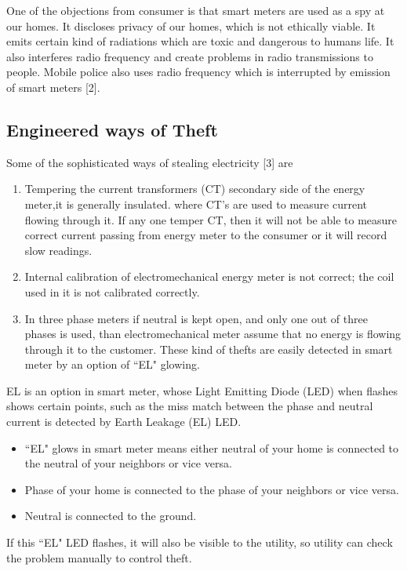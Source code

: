 \documentclass[10pt, conference, compsocconf]{IEEEtran}
\begin{document}
One of the objections from consumer is that smart meters are used as a spy at our homes. It discloses privacy of our homes, which is not ethically viable. It emits certain kind of radiations which are toxic and dangerous to humans life. It also interferes radio frequency and create problems in radio transmissions to people. Mobile police also uses radio frequency which is interrupted by emission of smart meters [2].

\subsection{Engineered ways of Theft}
 Some of the sophisticated ways of stealing electricity [3] are
 \begin{enumerate}
 \item
 Tempering the current transformers (CT) secondary side of the energy meter,it is generally insulated. where CT's are used to measure current flowing through it. If any one temper CT, then it will not be able to measure correct current passing from energy meter to the consumer or it will record slow readings.
 \item
 Internal calibration of electromechanical energy meter is not correct; the coil used in it is not calibrated correctly.
 \item
 In three phase meters if neutral is kept open, and only one out of three phases is used, than electromechanical meter assume that no energy is flowing through it to the customer. These kind of thefts are easily detected in smart meter by an option of ``EL" glowing.
 \end{enumerate}

EL is an option in smart meter, whose Light Emitting Diode (LED) when flashes shows certain points, such as the miss match between the phase and neutral current is detected by Earth Leakage (EL) LED.
\begin{itemize}
\item
``EL" glows in smart meter means either neutral of your home is connected to the neutral of your neighbors or vice versa.
\item
Phase of your home is connected to the phase of your neighbors or vice versa.
\item
Neutral is connected to the ground.
\end{itemize}

If this ``EL" LED flashes, it will also be visible to the utility, so utility can check the problem manually to control theft.
\end{document}
